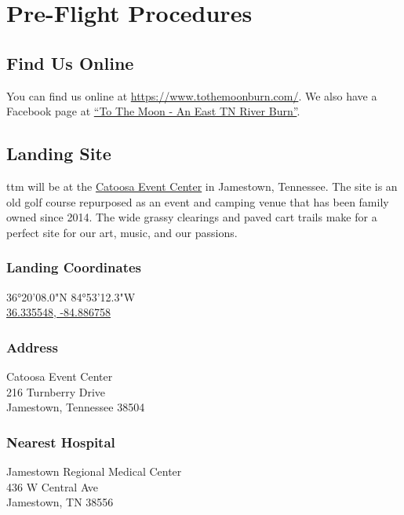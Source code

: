 %
%

\chapter{Pre-Flight Procedures}

\section*{Find Us Online}

You can find us online at \url{https://www.tothemoonburn.com/}.  We also have a Facebook page at \href{https://www.facebook.com/groups/1686191044986642/?ref=bookmarks}{``To The Moon - An East TN River Burn''}.

\section*{Landing Site}

\gls{ttm} will be at the \href{https://www.facebook.com/CatoosaEventCenter}{Catoosa Event Center} in Jamestown, Tennessee. The site is an old golf course repurposed as an event and camping venue that has been family owned since 2014.  The wide grassy clearings and paved cart trails make for a perfect site for our art, music, and our passions.  

\begin{multicols}{3}

\subsection*{Landing Coordinates}
36°20'08.0"N 84°53'12.3"W\\
\href{https://goo.gl/maps/UAsVxWwtG2ooPuDi7}{36.335548, -84.886758}

\subsection*{Address}
Catoosa Event Center\\
216 Turnberry Drive\\
Jamestown, Tennessee 38504

\subsection*{Nearest Hospital}
Jamestown Regional Medical Center\\
436 W Central Ave\\
Jamestown, TN 38556

\end{multicols}



